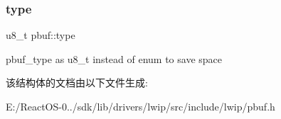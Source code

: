 \subsubsection{\texorpdfstring{type}{type}}
{\footnotesize\ttfamily u8\+\_\+t pbuf\+::type}

pbuf\+\_\+type as u8\+\_\+t instead of enum to save space 

该结构体的文档由以下文件生成\+:\begin{DoxyCompactItemize}
\item 
E\+:/\+React\+O\+S-\/0../sdk/lib/drivers/lwip/src/include/lwip/pbuf.\+h\end{DoxyCompactItemize}
